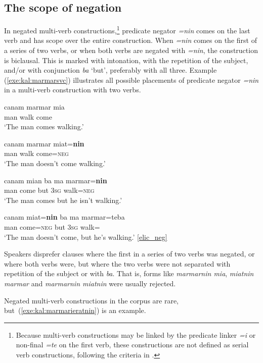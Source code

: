 \documentclass[output=paper,colorlinks,citecolor=brown,draft]{langscibook}
\begin{document}
\subsection{The scope of negation}
\label{sec:negSVCscope}
In negated multi-verb constructions,\footnote{Because multi-verb constructions may be linked by the predicate linker \textit{=i} or non-final \textit{=te} on the first verb, these constructions are not defined as serial verb constructions, following the criteria in \citet{Haspelmath2016}.} predicate negator \textit{=nin} comes on the last verb and has scope over the entire construction. When \textit{=nin} comes on the first of a series of two verbs, or when both verbs are negated with \textit{=nin}, the construction is biclausal. This is marked with intonation, with the repetition of the subject, and/or with conjunction \textit{ba} `but', preferably with all three. Example (\ref{exe:kal:marmarsvc}) illustrates all possible placements of predicate negator \textit{=nin} in a multi-verb construction with two verbs.

\ea \label{exe:kal:marmarsvc}
\ea \label{exe:kal:marmarmia}
\gll canam marmar mia\\
man walk come\\
\glt		`The man comes walking.'

\ex
\gll canam marmar miat=\textbf{nin}\\
man walk come=\textsc{neg}\\
\glt 	`The man doesn't come walking.'	

\ex
\gll canam mian ba ma marmar=\textbf{nin}\\
man come but \textsc{3sg} walk=\textsc{neg}\\
\glt	`The man comes but he isn't walking.'	

\ex \label{exe:kal:miatninbamarmar}
\gll canam miat=\textbf{nin} ba ma marmar=teba\\
man come=\textsc{neg} but \textsc{3sg} walk=\glteba\\
\glt	`The man doesn't come, but he's walking.' {\href{http://hdl.handle.net/10050/00-0000-0000-0004-1C60-A}{[elic\_neg]}}
\z \z 

Speakers disprefer clauses where the first in a series of two verbs was negated, or where both verbs were, but where the two verbs were not separated with repetition of the subject or with \textit{ba}. That is, forms like \textit{marmarnin mia}, \textit{miatnin marmar} and \textit{marmarnin miatnin} were usually rejected.

Negated multi-verb constructions in the corpus are rare, but~(\ref{exe:kal:marmarieratnin}) is an example.
\end{document}
